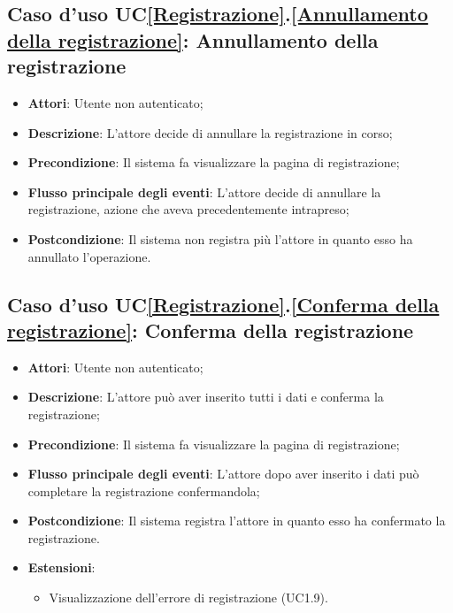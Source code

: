 \subsection{Caso d'uso UC\ref{Registrazione}.\ref{Annullamento della registrazione}: Annullamento della registrazione}
\begin{itemize}
	\item \textbf{Attori}: Utente non autenticato;
	\item \textbf{Descrizione}: L'attore decide di annullare la registrazione in corso;
	\item \textbf{Precondizione}: Il sistema fa visualizzare la pagina di registrazione;
	\item \textbf{Flusso principale degli eventi}: L'attore decide di annullare la registrazione, azione che aveva precedentemente intrapreso;
	\item \textbf{Postcondizione}: Il sistema non registra più l'attore in quanto esso ha annullato l'operazione.
\end{itemize}

\subsection{Caso d'uso UC\ref{Registrazione}.\ref{Conferma della registrazione}: Conferma della registrazione}
\begin{itemize}
	\item \textbf{Attori}: Utente non autenticato;
	\item \textbf{Descrizione}: L'attore può aver inserito tutti i dati  e conferma la registrazione;
	\item \textbf{Precondizione}: Il sistema fa visualizzare la pagina di registrazione;
	\item \textbf{Flusso principale degli eventi}: L'attore dopo aver inserito i dati può completare la registrazione confermandola;
	\item \textbf{Postcondizione}: Il sistema registra l'attore in quanto esso ha confermato la registrazione.
	\item \textbf{Estensioni}:
	\begin{itemize}
		\item Visualizzazione dell'errore di registrazione (UC1.9).
	\end{itemize}
\end{itemize}

